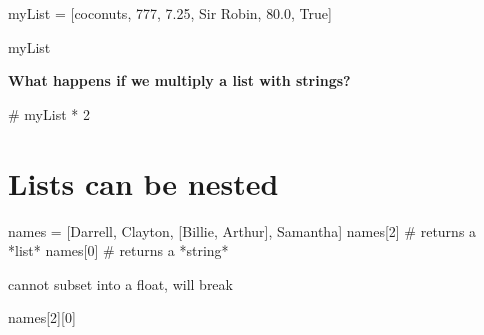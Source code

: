 \documentclass[
  letterpaper,
  DIV=11,
  numbers=noendperiod]{scrreprt}
\newenvironment{Shaded}{\begin{snugshade}}{\end{snugshade}}
\newcommand{\CommentTok}[1]{\textcolor[rgb]{0.37,0.37,0.37}{#1}}
\newcommand{\DecValTok}[1]{\textcolor[rgb]{0.68,0.00,0.00}{#1}}
\newcommand{\FloatTok}[1]{\textcolor[rgb]{0.68,0.00,0.00}{#1}}
\newcommand{\NormalTok}[1]{\textcolor[rgb]{0.00,0.23,0.31}{#1}}
\newcommand{\OperatorTok}[1]{\textcolor[rgb]{0.37,0.37,0.37}{#1}}
\newcommand{\StringTok}[1]{\textcolor[rgb]{0.13,0.47,0.30}{#1}}
\newcommand{\VariableTok}[1]{\textcolor[rgb]{0.07,0.07,0.07}{#1}}
\begin{document}
\begin{Shaded}
\begin{Highlighting}[]
\NormalTok{myList }\OperatorTok{=}\NormalTok{ [}\StringTok{\textquotesingle{}coconuts\textquotesingle{}}\NormalTok{, }\DecValTok{777}\NormalTok{, }\FloatTok{7.25}\NormalTok{, }\StringTok{\textquotesingle{}Sir Robin\textquotesingle{}}\NormalTok{, }\FloatTok{80.0}\NormalTok{, }\VariableTok{True}\NormalTok{]}
\end{Highlighting}
\end{Shaded}

\begin{Shaded}
\begin{Highlighting}[]
\NormalTok{myList}
\end{Highlighting}
\end{Shaded}

\textbf{What happens if we multiply a list with strings?}

\begin{Shaded}
\begin{Highlighting}[]
\CommentTok{\# myList * 2}
\end{Highlighting}
\end{Shaded}

\hypertarget{lists-can-be-nested}{%
\section{Lists can be nested}\label{lists-can-be-nested}}

\begin{Shaded}
\begin{Highlighting}[]
\NormalTok{names }\OperatorTok{=}\NormalTok{ [}\StringTok{\textquotesingle{}Darrell\textquotesingle{}}\NormalTok{, }\StringTok{\textquotesingle{}Clayton\textquotesingle{}}\NormalTok{, [}\StringTok{\textquotesingle{}Billie\textquotesingle{}}\NormalTok{, }\StringTok{\textquotesingle{}Arthur\textquotesingle{}}\NormalTok{], }\StringTok{\textquotesingle{}Samantha\textquotesingle{}}\NormalTok{]}
\NormalTok{names[}\DecValTok{2}\NormalTok{] }\CommentTok{\# returns a *list*}
\NormalTok{names[}\DecValTok{0}\NormalTok{] }\CommentTok{\# returns a *string*}
\end{Highlighting}
\end{Shaded}

cannot subset into a float, will break

\begin{Shaded}
\begin{Highlighting}[]
\NormalTok{names[}\DecValTok{2}\NormalTok{][}\DecValTok{0}\NormalTok{]}
\end{Highlighting}
\end{Shaded}
\end{document}
